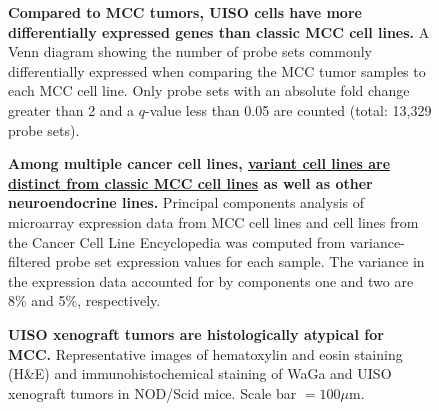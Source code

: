 \documentclass[10pt]{article}
\begin{document}
\begin{figure}[!ht]

  \begin{center}
  \end{center}

  \caption{
    {\bf Compared to MCC tumors, UISO cells have more differentially expressed genes than classic MCC cell lines.}
    A Venn diagram showing the number of probe sets commonly differentially expressed when comparing the MCC tumor samples to each MCC cell line.
    Only probe sets with an absolute fold change greater than 2 and a $q$-value less than 0.05 are counted (total: 13,329 probe sets).}

  \label{fig:venn}
\end{figure}


\begin{figure}[!ht]
  \begin{center}
  \end{center}

  \caption{
    {\bf Among multiple cancer cell lines, \uline{variant cell lines are distinct from classic MCC cell lines} as well as other neuroendocrine lines.}
    Principal components analysis of microarray expression data from MCC cell lines and cell lines from the Cancer Cell Line Encyclopedia was computed from variance-filtered probe set expression values for each sample.
    The variance in the expression data accounted for by components one and two are 8\% and 5\%, respectively.}

  \label{fig:pcaccle}
\end{figure}

\begin{figure}[!ht]
  \begin{center}
  \end{center}

  \caption{
    {\bf UISO xenograft tumors are histologically atypical for MCC.}
    Representative images of hematoxylin and eosin staining (H\&E) and immunohistochemical staining of WaGa and UISO xenograft tumors in NOD/Scid mice.
    Scale bar $=100\mu\mathrm{m}$.}

  \label{fig:ihc}
\end{figure}


\end{document}
